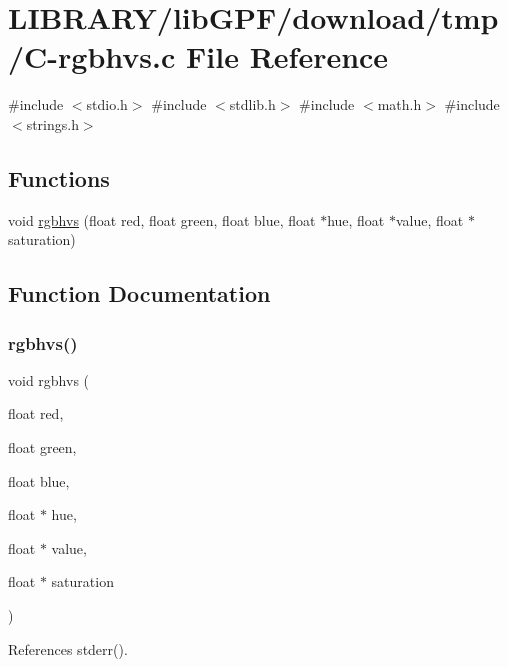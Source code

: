 \hypertarget{C-rgbhvs_8c}{}\section{L\+I\+B\+R\+A\+R\+Y/lib\+G\+P\+F/download/tmp/\+C-\/rgbhvs.c File Reference}
\label{C-rgbhvs_8c}
{\ttfamily \#include $<$stdio.\+h$>$}\newline
{\ttfamily \#include $<$stdlib.\+h$>$}\newline
{\ttfamily \#include $<$math.\+h$>$}\newline
{\ttfamily \#include $<$strings.\+h$>$}\newline
\subsection*{Functions}
\begin{DoxyCompactItemize}
\item 
void \hyperlink{C-rgbhvs_8c_a4110202639bfb2a997338ea37775dca8}{rgbhvs} (float red, float green, float blue, float $\ast$hue, float $\ast$value, float $\ast$saturation)
\end{DoxyCompactItemize}


\subsection{Function Documentation}
\mbox{\label{C-rgbhvs_8c_a4110202639bfb2a997338ea37775dca8}} 
\subsubsection{\texorpdfstring{rgbhvs()}{rgbhvs()}}
{\footnotesize\ttfamily void rgbhvs (\begin{DoxyParamCaption}\item[{float}]{red,  }\item[{float}]{green,  }\item[{float}]{blue,  }\item[{float $\ast$}]{hue,  }\item[{float $\ast$}]{value,  }\item[{float $\ast$}]{saturation }\end{DoxyParamCaption})}



References stderr().

